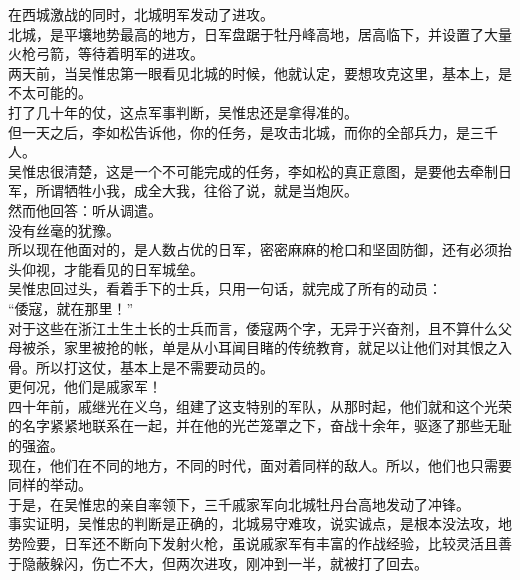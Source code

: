 \begin{multicols}{\theparacolNo}
在西城激战的同时，北城明军发动了进攻。\\

北城，是平壤地势最高的地方，日军盘踞于牡丹峰高地，居高临下，并设置了大量火枪弓箭，等待着明军的进攻。\\

两天前，当吴惟忠第一眼看见北城的时候，他就认定，要想攻克这里，基本上，是不太可能的。\\

打了几十年的仗，这点军事判断，吴惟忠还是拿得准的。\\

但一天之后，李如松告诉他，你的任务，是攻击北城，而你的全部兵力，是三千人。\\

吴惟忠很清楚，这是一个不可能完成的任务，李如松的真正意图，是要他去牵制日军，所谓牺牲小我，成全大我，往俗了说，就是当炮灰。\\

然而他回答：听从调遣。\\

没有丝毫的犹豫。\\

所以现在他面对的，是人数占优的日军，密密麻麻的枪口和坚固防御，还有必须抬头仰视，才能看见的日军城垒。\\

吴惟忠回过头，看着手下的士兵，只用一句话，就完成了所有的动员：\\

“倭寇，就在那里！”\\

对于这些在浙江土生土长的士兵而言，倭寇两个字，无异于兴奋剂，且不算什么父母被杀，家里被抢的帐，单是从小耳闻目睹的传统教育，就足以让他们对其恨之入骨。所以打这仗，基本上是不需要动员的。\\

更何况，他们是戚家军！\\

四十年前，戚继光在义乌，组建了这支特别的军队，从那时起，他们就和这个光荣的名字紧紧地联系在一起，并在他的光芒笼罩之下，奋战十余年，驱逐了那些无耻的强盗。\\

现在，他们在不同的地方，不同的时代，面对着同样的敌人。所以，他们也只需要同样的举动。\\

于是，在吴惟忠的亲自率领下，三千戚家军向北城牡丹台高地发动了冲锋。\\

事实证明，吴惟忠的判断是正确的，北城易守难攻，说实诚点，是根本没法攻，地势险要，日军还不断向下发射火枪，虽说戚家军有丰富的作战经验，比较灵活且善于隐蔽躲闪，伤亡不大，但两次进攻，刚冲到一半，就被打了回去。\\


\end{multicols}
